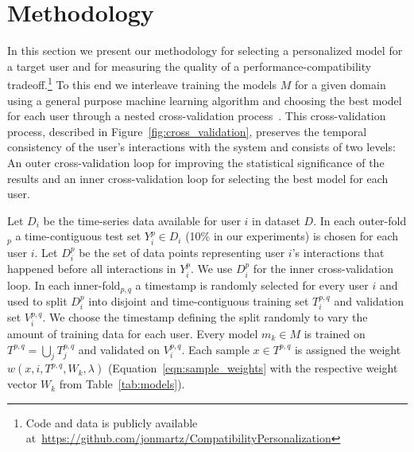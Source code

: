 \documentclass[letterpaper]{article} %
\theoremstyle{definition}
\begin{document}



%
\section{Methodology}
\label{sec:methodology}
%
In this  section we present  our  methodology for selecting a personalized model for a target user and for measuring the quality of a performance-compatibility tradeoff.\footnote{Code and data  is publicly available  at~\url{https://github.com/jonmartz/CompatibilityPersonalization}}
To this end we interleave training the models $M$ for a given domain using a general purpose machine learning algorithm and  choosing the  best model for each user through a nested  cross-validation process~\cite{tashman2000out}.
This cross-validation process, described in Figure~\ref{fig:cross_validation}, preserves the temporal consistency of the user's interactions with the system and consists of two levels: An outer cross-validation loop for improving the statistical significance of the results and an inner cross-validation loop for selecting the best model for each user.

Let $D_i$ be the time-series data available for user $i$ in dataset $D$. In each outer-fold$_p$ a time-contiguous test set $Y_i^p\in D_i$ (10\% in our experiments) is chosen for each user $i$.
Let $D_i^p$ be the set of data points representing user $i$'s interactions that happened before all interactions in $Y_i^p$. We use $D_i^p$ for the inner cross-validation loop.
In each inner-fold$_{p,q}$ a timestamp is randomly selected for every user $i$ and used to split $D_i^p$ into disjoint and time-contiguous training set $T_i^{p,q}$ and validation set $V_i^{p,q}$.
We choose the timestamp defining the split randomly to vary the amount of training data for each user.
Every model $m_k\in M$ is trained on $T^{p,q}=\bigcup_j T_j^{p,q}$  and validated on $V_i^{p,q}$.
Each sample $x\in T^{p,q}$ is assigned the weight $w(x,i,T^{p,q},W_k,\lambda)$ (Equation~\ref{eqn:sample_weights} with the respective weight vector $W_k$ from Table~\ref{tab:models}).
\end{document}
